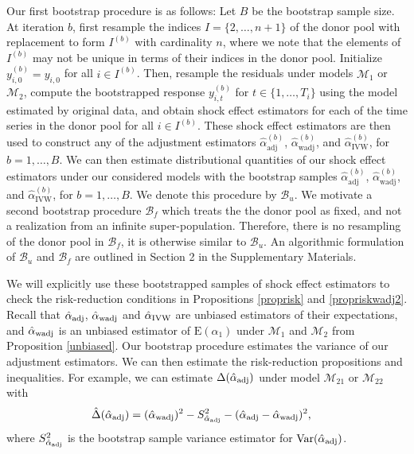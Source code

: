\documentclass[11pt,3p,review,authoryear]{elsarticle}
\def\mrm#1{\mathrm{#1}} %
\def\mc#1{\mathcal{#1}} %
\def\E#1{\mathrm{E}(#1)} %
\DeclareMathOperator{\Var}{Var} %
\theoremstyle{definition}
\begin{document}
Our first bootstrap procedure is as follows: Let $B$ be the bootstrap sample size. At iteration $b$, first resample the indices $I = \{2, \ldots, n+1\}$ of the donor pool with replacement to form $I^{(b)}$ with cardinality $n$, where we note that the elements of $I^{(b)}$ may not be unique in terms of their  indices in the donor pool. Initialize $y_{i,0}^{(b)}=y_{i,0}$ for all $i \in I^{(b)}$. Then, resample the residuals under models $\mc{M}_1$ or $\mc{M}_{2}$, compute the bootstrapped response  $y_{i,t}^{(b)}$ for   $t \in \{1, \ldots, T_i\}$ using the model estimated by original data,  and obtain shock effect estimators for each of the time series in the donor pool for all $i \in I^{(b)}$. These shock effect estimators are then used to construct any of the adjustment estimators $\hat{\alpha}^{(b)}_{\mrm{adj}}$, $\hat{\alpha}^{(b)}_{\mrm{wadj}}$, and $\hat{\alpha}^{(b)}_{\mrm{IVW}}$, for $b = 1,\ldots,B$. We can then estimate distributional quantities of our shock effect estimators under our considered models with the bootstrap samples $\hat{\alpha}^{(b)}_{\mrm{adj}}$, $\hat{\alpha}^{(b)}_{\mrm{wadj}}$, and $\hat{\alpha}^{(b)}_{\mrm{IVW}}$, for $b = 1,\ldots,B$. We denote this procedure by $\mc{B}_u$. We motivate a second bootstrap procedure $\mc{B}_f$ which treats the the donor pool as fixed, and not a realization from an infinite super-population. Therefore, there is no resampling of the donor pool in $\mc{B}_f$, it is otherwise similar to $\mc{B}_u$. An algorithmic formulation of $\mc{B}_u$ and $\mc{B}_f$  are outlined in Section 2 in the Supplementary Materials.

We will explicitly use these bootstrapped samples of shock effect estimators to check the risk-reduction conditions in Propositions \ref{proprisk} and \ref{propriskwadj2}. Recall that $\hat{\alpha}_{\rm adj}$,  $\hat{\alpha}_{\rm wadj}$ and $\hat{\alpha}_{\rm IVW}$ are unbiased estimators of their expectations, and $\hat{\alpha}_{\rm wadj}$ is an unbiased estimator of $\E{\alpha_1}$ under $\mc{M}_1$ and $\mc{M}_2$ from Proposition \ref{unbiased}. Our bootstrap procedure estimates the variance of our adjustment estimators. We can then estimate the risk-reduction propositions and inequalities. For example, we can estimate $\Delta(\hat{\alpha}_{\rm adj})$ under model $\mc{M}_{21}$ or $\mc{M}_{22}$ with 
\begin{align*}
  \hat{\Delta}(\hat{\alpha}_{\rm adj}) & = (\hat{\alpha}_{\rm wadj})^2 -S^2_{\hat{\alpha}_{\rm adj}} -(\hat{\alpha}_{\rm adj}-\hat{\alpha}_{\rm wadj})^2,
\end{align*}
where $S^2_{\hat{\alpha}_{\rm adj}}$ is the bootstrap sample variance estimator for $\Var(\hat{\alpha}_{\rm adj})$. 
\end{document}
